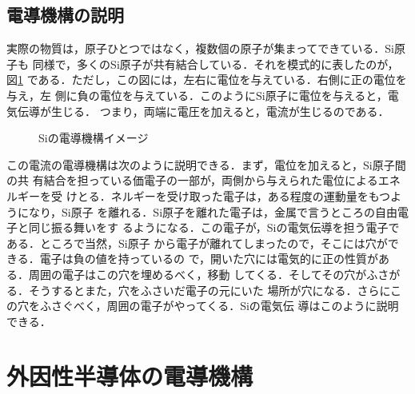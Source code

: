         \subsection{電導機構の説明}
            実際の物質は，原子ひとつではなく，複数個の原子が集まってできている．Si原子も
            同様で，多くのSi原子が共有結合している．それを模式的に表したのが，図\ref{fig:SiDendou}
            である．ただし，この図には，左右に電位を与えている．右側に正の電位を与え，左
            側に負の電位を与えている．このようにSi原子に電位を与えると，電気伝導が生じる．
            つまり，両端に電圧を加えると，電流が生じるのである．
                            \begin{figure}[htbp]
                                \begin{center}
                                    \caption{Siの電導機構イメージ}
                                    \label{fig:SiDendou}
                                \end{center}
                            \end{figure}

            この電流の電導機構は次のように説明できる．まず，電位を加えると，Si原子間の共
            有結合を担っている価電子の一部が，両側から与えられた電位によるエネルギーを受
            けとる．ネルギーを受け取った電子は，ある程度の運動量をもつようになり，Si原子
            を離れる．Si原子を離れた電子は，金属で言うところの自由電子と同じ振る舞いをす
            るようになる．この電子が，Siの電気伝導を担う電子である．ところで当然，Si原子
            から電子が離れてしまったので，そこには穴ができる．電子は負の値を持っているの
            で，開いた穴には電気的に正の性質がある．周囲の電子はこの穴を埋めるべく，移動
            してくる．そしてその穴がふさがる．そうするとまた，穴をふさいだ電子の元にいた
            場所が穴になる．さらにこの穴をふさぐべく，周囲の電子がやってくる．Siの電気伝
            導はこのように説明できる．

    \section{外因性半導体の電導機構}
